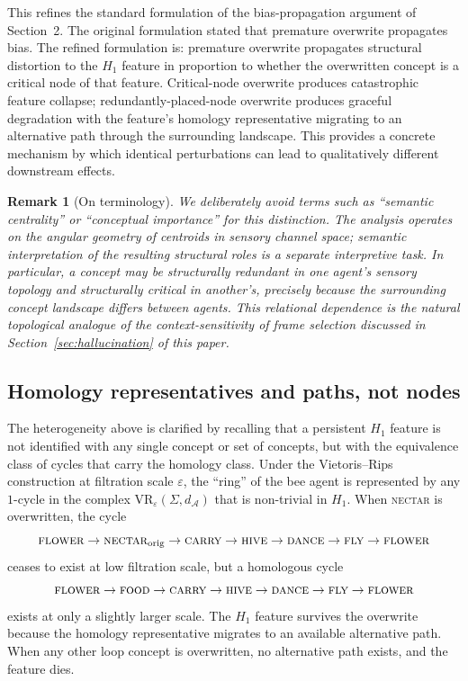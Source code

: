 \documentclass[12pt]{article}
\newtheorem{remark}{Remark}
\begin{document}
This refines the standard formulation of the bias-propagation argument of Section~2.
The original formulation stated that premature overwrite propagates
bias. The refined formulation is: premature overwrite propagates
structural distortion to the $H_1$ feature in proportion to whether
the overwritten concept is a critical node of that feature.
Critical-node overwrite produces catastrophic feature collapse;
redundantly-placed-node overwrite produces graceful degradation
with the feature's homology representative migrating to an alternative
path through the surrounding landscape.
This provides a concrete mechanism by which identical perturbations
can lead to qualitatively different downstream effects.

\begin{remark}[On terminology]
We deliberately avoid terms such as ``semantic centrality'' or
``conceptual importance'' for this distinction. The analysis
operates on the angular geometry of centroids in sensory channel
space; semantic interpretation of the resulting structural roles is
a separate interpretive task. In particular, a concept may be
structurally redundant in one agent's sensory topology and
structurally critical in another's, precisely because the
surrounding concept landscape differs between agents. This
relational dependence is the natural topological analogue of the
context-sensitivity of frame selection discussed in Section~\ref{sec:hallucination} of this paper.
\end{remark}

\subsection*{Homology representatives and paths, not nodes}

The heterogeneity above is clarified by recalling that a persistent
$H_1$ feature is not identified with any single concept or set of
concepts, but with the equivalence class of cycles that carry the
homology class. Under the Vietoris--Rips construction at filtration
scale $\varepsilon$, the ``ring'' of the bee agent is represented
by any $1$-cycle in the complex $\mathrm{VR}_\varepsilon(\Sigma,
d_\mathcal{A})$ that is non-trivial in $H_1$. When
\textsc{nectar} is overwritten, the cycle
\[
\textsc{flower} \to \textsc{nectar}_\mathrm{orig} \to \textsc{carry}
  \to \textsc{hive} \to \textsc{dance} \to \textsc{fly} \to
  \textsc{flower}
\]
ceases to exist at low filtration scale, but a homologous cycle
\[
\textsc{flower} \to \textsc{food} \to \textsc{carry} \to \textsc{hive}
  \to \textsc{dance} \to \textsc{fly} \to \textsc{flower}
\]
exists at only a slightly larger scale. The $H_1$ feature survives
the overwrite because the homology representative migrates to an
available alternative path. When any other loop concept is
overwritten, no alternative path exists, and the feature dies.
\end{document}
